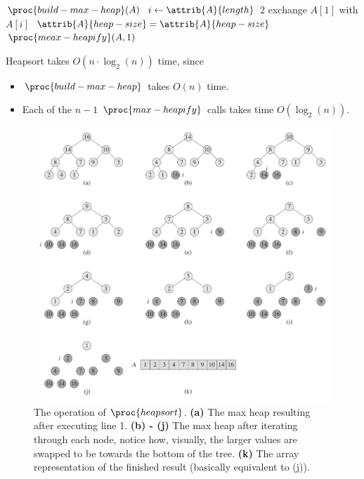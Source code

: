 \documentclass{article}
\begin{document}
\begin{codebox}
\li $\proc{build-max-heap}(A)$
\li \For $i \gets \attrib{A}{length}$ \Downto $2$
\li \Do
        exchange $A[1]$ with $A[i]$
\li     $\attrib{A}{heap-size} = \attrib{A}{heap-size}$
\li     $\proc{meax-heapify}(A, 1)$
    \End
\end{codebox}

Heapsort takes $O(n \cdot \log_2(n))$ time, since
\begin{itemize}
    \item $\proc{build-max-heap}$ takes $O(n)$ time.
    \item Each of the $n-1$ $\proc{max-heapify}$ calls takes time $O(\log_2(n))$.
\end{itemize}

\newpage

\begin{figure}[!ht]
\centering
\includegraphics[scale=0.65]{heapsort}
\caption{
    The operation of $\proc{heapsort}$. \textbf{(a)} The max heap resulting after executing line 1. \textbf{(b) - (j)} The max heap after iterating through each node, notice how, visually, the larger values are swapped to be towards the bottom of the tree. \textbf{(k)} The array representation of the finished result (basically equivalent to (j)).
}
\label{fig:heapsort}
\end{figure}
\end{document}
